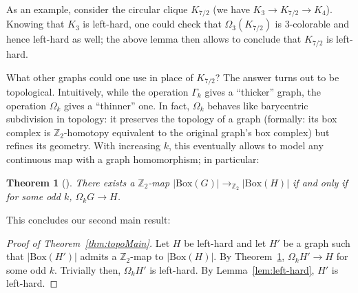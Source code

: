 \documentclass[11pt,a4paper]{scrartcl}
\newtheorem{theorem}{Theorem}
\numberwithin{theorem}{section}
\theoremstyle{definition}
\newcommand{\ZZ}{\mathbb{Z}}
\newcommand\BBox[1]{\left|\mathrm{Box}(#1)\right|}
\begin{document}
As an example, consider the circular clique $K_{7/2}$ (we have $K_3 \to K_{7/2} \to K_4$).
Knowing that $K_3$ is left-hard, one could check that $\Omega_3(K_{7/2})$ is 3-colorable and hence left-hard as well;
the above lemma then allows to conclude that $K_{7/2}$ is left-hard.

What other graphs could one use in place of $K_{7/2}$?
The answer turns out to be topological.
Intuitively, while the operation $\Gamma_k$ gives a ``thicker'' graph,
the operation $\Omega_k$ gives a ``thinner'' one.
In fact, $\Omega_k$ behaves like barycentric subdivision in topology: it preserves the topology of a graph (formally: its box complex is $\ZZ_2$-homotopy equivalent to the original graph's box complex) but refines its geometry.
With increasing $k$, this eventually allows to model any continuous map with a graph homomorphism; in particular:

\begin{theorem}[\cite{Wrochna17b}]\label{thm:approx}
	There exists a $\ZZ_2$-map $\BBox{G} \to_{\ZZ_2} \BBox{H}$ if and only if for some odd $k$, $\Omega_k G \to H$.
\end{theorem}

\noindent
This concludes our second main result:

\begin{proof}[Proof of Theorem~\ref{thm:topoMain}]
	Let $H$ be left-hard and let $H'$ be a graph such that $\BBox{H'}$ admits a $\ZZ_{2}$-map to $\BBox{H}$.
	By Theorem~\ref{thm:approx}, $\Omega_k H' \to H$ for some odd $k$.
	Trivially then, $\Omega_k H'$ is left-hard.
	By Lemma~\ref{lem:left-hard}, $H'$ is left-hard.
\end{proof}

	
\end{document}
